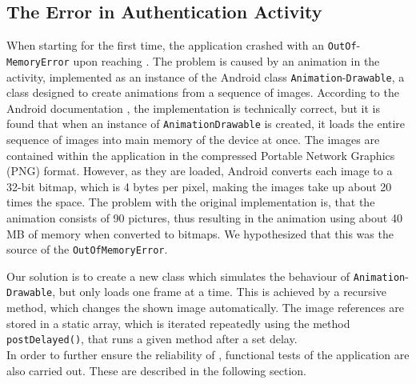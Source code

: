 \subsection{The Error in Authentication Activity}
When starting \launcher for the first time, the application crashed with an \lstinline{OutOf}-\lstinline{MemoryError} upon reaching \authenticationactivity.
The problem is caused by an animation in the activity, implemented as an instance of the Android class \lstinline{Animation}-\lstinline{Drawable}, a class designed to create animations from a sequence of images.
According to the Android documentation \citet{androidreference}, the implementation is technically correct, but it is found that when an instance of \lstinline{AnimationDrawable} is created, it loads the entire sequence of images into main memory of the device at once.
The images are contained within the application in the compressed Portable Network Graphics (PNG) format.
However, as they are loaded, Android converts each image to a 32-bit bitmap, which is 4 bytes per pixel, making the images take up about 20 times the space.
The problem with the original implementation is, that the animation consists of 90 pictures, thus resulting in the animation using about 40 MB of memory when converted to bitmaps. 
We hypothesized that this was the source of the \lstinline{OutOfMemoryError}.

Our solution is to create a new class which simulates the behaviour of \lstinline{Animation}-\lstinline{Drawable}, but only loads one frame at a time.
This is achieved by a recursive method, which changes the shown image automatically.
The image references are stored in a static array, which is iterated repeatedly using the method \lstinline|postDelayed()|, that runs a given method after a set delay.\\

In order to further ensure the reliability of \launcher, functional tests of the application are also carried out.
These are described in the following section.